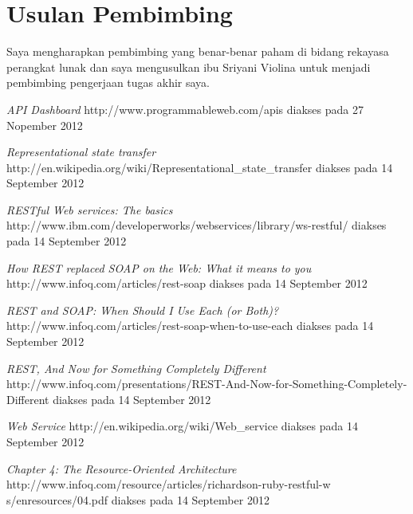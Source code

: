 \documentclass[a4paper, 12pt]{report}
\begin{document}
\section*{Usulan Pembimbing}
Saya mengharapkan pembimbing yang benar-benar paham di bidang rekayasa perangkat lunak dan saya mengusulkan ibu Sriyani Violina untuk menjadi pembimbing pengerjaan tugas akhir saya.

\begin{thebibliography}{99}

  \emph{API Dashboard}
  http://www.programmableweb.com/apis
  diakses pada 27 Nopember 2012

  \emph{Representational state transfer}
  http://en.wikipedia.org/wiki/Representational\_state\_transfer
  diakses pada 14 September 2012 

  \emph{RESTful Web services: The basics}
  http://www.ibm.com/developerworks/webservices/library/ws-restful/
  diakses pada 14 September 2012
  
  \emph{How REST replaced SOAP on the Web: What it means to you}
  http://www.infoq.com/articles/rest-soap
  diakses pada 14 September 2012
  
  \emph{REST and SOAP: When Should I Use Each (or Both)?}
  http://www.infoq.com/articles/rest-soap-when-to-use-each
  diakses pada 14 September 2012
  
  \emph{REST, And Now for Something Completely Different}
  http://www.infoq.com/presentations/REST-And-Now-for-Something-Completely-Different
  diakses pada 14 September 2012
  
  \emph{Web Service}
  http://en.wikipedia.org/wiki/Web\_service
  diakses pada 14 September 2012
  
  \emph{Chapter 4: The Resource-Oriented Architecture}
  http://www.infoq.com/resource/articles/richardson-ruby-restful-w  s/enresources/04.pdf
  diakses pada 14 September 2012

\end{thebibliography}
\end{document}
